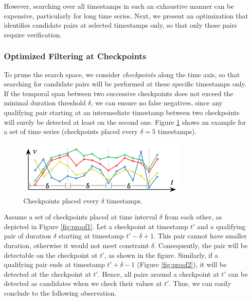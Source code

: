 However, searching over all timestamps in such an exhaustive manner can be expensive, particularly for long time series. Next, we present an optimization that identifies candidate pairs at selected timestamps only, so that only those pairs require verification.

\subsubsection{Optimized Filtering at Checkpoints}
\label{sec:checkpoint_join}

To prune the search space, we consider \textit{checkpoints} along the time axis, so that searching for candidate pairs will be performed at these specific timestamps only. If the temporal span between two successive checkpoints does not exceed the minimal duration threshold $\delta$, we can ensure no false negatives, since any qualifying pair starting at an intermediate timestamp between two checkpoints will surely be detected at least on the second one. Figure \ref{fig:checkpoints} shows an example for a set of time series (checkpoints placed every $\delta=5$ timestamps).

\begin{figure}[tb]
    \centering
    \includegraphics[width=0.75\textwidth]{figures/checkpoints.png}
    \caption{Checkpoints placed every $\delta$ timestamps.}
    \label{fig:checkpoints}
\end{figure}

Assume a set of checkpoints placed at time interval $\delta$ from each other, as depicted in Figure \ref{fig:proof1}. Let a checkpoint at timestamp $t'$ and a qualifying pair of duration $\delta$ starting at timestamp $t'-\delta+1$. This pair cannot have smaller duration, otherwise it would not meet constraint $\delta$. Consequently, the pair will be detectable on the checkpoint at $t'$, as shown in the figure. Similarly, if a qualifying pair ends at timestamp $t'+\delta-1$ (Figure \ref{fig:proof2}), it will be detected at the checkpoint at $t'$. Hence, all pairs around a checkpoint at $t'$ can be detected as candidates when we check their values at $t'$. Thus, we can easily conclude to the following observation.

